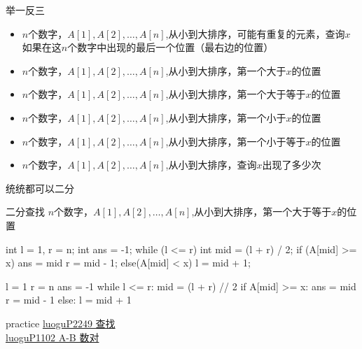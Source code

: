 \documentclass[aspectratio=169,xcolor=dvipsnames]{beamer}
\begin{document}
\begin{frame}[fragile]{举一反三}
    \begin{itemize}
        \item $n$个数字，$A[1],A[2],\ldots,A[n]$,从小到大排序，可能有重复的元素，查询$x$如果在这$n$个数字中出现的最后一个位置（最右边的位置）
        \item $n$个数字，$A[1],A[2],\ldots,A[n]$,从小到大排序，第一个大于$x$的位置
        \item $n$个数字，$A[1],A[2],\ldots,A[n]$,从小到大排序，第一个大于等于$x$的位置
        \item $n$个数字，$A[1],A[2],\ldots,A[n]$,从小到大排序，第一个小于$x$的位置
        \item $n$个数字，$A[1],A[2],\ldots,A[n]$,从小到大排序，第一个小于等于$x$的位置
        \item $n$个数字，$A[1],A[2],\ldots,A[n]$,从小到大排序，查询$x$出现了多少次
    \end{itemize}
    \vspace*{2.5em}
    统统都可以二分
\end{frame}


\begin{frame}[fragile]{二分查找}
    $n$个数字，$A[1],A[2],\ldots,A[n]$,从小到大排序，第一个大于等于$x$的位置
    \begin{minipage}{0.45\textwidth}
        \centering
        \begin{cppcode}
    int l = 1, r = n;
    int ans = -1;
    while (l <= r) {
        int mid = (l + r) / 2;
        if (A[mid] >= x) {
            ans = mid
            r = mid - 1;
        } else(A[mid] < x) {
            l = mid + 1;
        }
    }
        \end{cppcode}
    \end{minipage}%
    \hfill
    \begin{minipage}{0.45\textwidth}
        \centering
        \begin{pycode}
    l = 1
    r = n
    ans = -1
    while l <= r:
        mid = (l + r) // 2
        if A[mid] >= x:
            ans = mid
            r = mid - 1
        else:
            l = mid + 1
        \end{pycode}
    \end{minipage}
    
\end{frame}
    

\begin{frame}{practice}
    \href{https://www.luogu.com.cn/problem/P2249}{luoguP2249 查找}\\
    \href{https://www.luogu.com.cn/problem/P1102}{luoguP1102 A-B 数对}
\end{frame}
\end{document}
